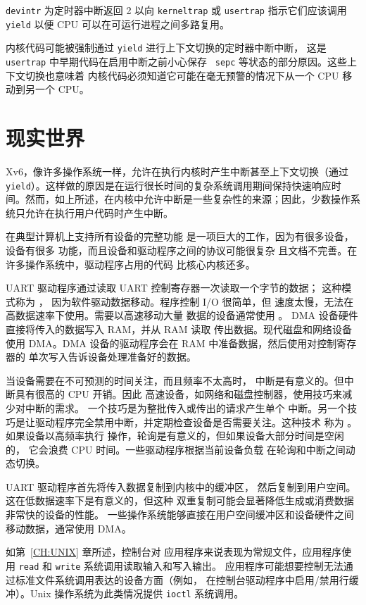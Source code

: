 {\tt devintr} 为定时器中断返回 2
以向 {\tt kerneltrap}
或 {\tt usertrap} 指示它们应该调用 {\tt yield} 以便
CPU 可以在可运行进程之间多路复用。

内核代码可能被强制通过 {\tt yield} 进行上下文切换的定时器中断中断，
这是 {\tt usertrap} 中早期代码在启用中断之前小心保存 {\tt
  sepc} 等状态的部分原因。这些上下文切换也意味着
内核代码必须知道它可能在毫无预警的情况下从一个 CPU 移动到另一个 CPU。

\section{现实世界}

Xv6，像许多操作系统一样，允许在执行内核时产生中断甚至上下文切换（通过 {\tt yield}）。这样做的原因是在运行很长时间的复杂系统调用期间保持快速响应时间。然而，如上所述，在内核中允许中断是一些复杂性的来源；因此，少数操作系统只允许在执行用户代码时产生中断。

在典型计算机上支持所有设备的完整功能
是一项巨大的工作，因为有很多设备，设备有很多
功能，而且设备和驱动程序之间的协议可能很复杂
且文档不完善。在许多操作系统中，驱动程序占用的代码
比核心内核还多。

UART 驱动程序通过读取 UART 控制寄存器一次读取一个字节的数据；
这种模式称为 ，
因为软件驱动数据移动。程序控制 I/O 很简单，但
速度太慢，无法在高数据速率下使用。需要以高速移动大量
数据的设备通常使用 。
DMA 设备硬件直接将传入的数据写入 RAM，并从 RAM 读取
传出数据。现代磁盘和网络设备使用 DMA。DMA
设备的驱动程序会在 RAM 中准备数据，然后使用对控制寄存器的
单次写入告诉设备处理准备好的数据。

当设备需要在不可预测的时间关注，而且频率不太高时，
中断是有意义的。但中断具有很高的 CPU 开销。因此
高速设备，如网络和磁盘控制器，使用技巧来减少对中断的需求。
一个技巧是为整批传入或传出的请求产生单个
中断。另一个技巧是让驱动程序完全禁用中断，并定期检查设备是否需要关注。这种技术
称为 。如果设备以高频率执行
操作，轮询是有意义的，但如果设备大部分时间是空闲的，
它会浪费 CPU 时间。一些驱动程序根据当前设备负载
在轮询和中断之间动态切换。

UART 驱动程序首先将传入数据复制到内核中的缓冲区，
然后复制到用户空间。这在低数据速率下是有意义的，但这种
双重复制可能会显著降低生成或消费数据非常快的设备的性能。
一些操作系统能够直接在用户空间缓冲区和设备硬件之间
移动数据，通常使用 DMA。

如第~\ref{CH:UNIX} 章所述，控制台对
应用程序来说表现为常规文件，应用程序使用 \lstinline{read} 和 \lstinline{write} 系统调用读取输入和写入输出。
应用程序可能想要控制无法通过标准文件系统调用表达的设备方面（例如，
在控制台驱动程序中启用/禁用行缓冲）。Unix
操作系统为此类情况提供 \lstinline{ioctl} 系统调用。

